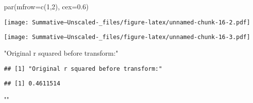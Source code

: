 \documentclass[
]{article}
\newenvironment{Shaded}{\begin{snugshade}}{\end{snugshade}}
\newcommand{\AttributeTok}[1]{\textcolor[rgb]{0.77,0.63,0.00}{#1}}
\newcommand{\DecValTok}[1]{\textcolor[rgb]{0.00,0.00,0.81}{#1}}
\newcommand{\FloatTok}[1]{\textcolor[rgb]{0.00,0.00,0.81}{#1}}
\newcommand{\FunctionTok}[1]{\textcolor[rgb]{0.00,0.00,0.00}{#1}}
\newcommand{\NormalTok}[1]{#1}
\newcommand{\SpecialCharTok}[1]{\textcolor[rgb]{0.00,0.00,0.00}{#1}}
\newcommand{\StringTok}[1]{\textcolor[rgb]{0.31,0.60,0.02}{#1}}
\begin{document}
\begin{Shaded}
\begin{Highlighting}[]
\FunctionTok{par}\NormalTok{(}\AttributeTok{mfrow=}\FunctionTok{c}\NormalTok{(}\DecValTok{1}\NormalTok{,}\DecValTok{2}\NormalTok{), }\AttributeTok{cex=}\FloatTok{0.6}\NormalTok{)}
\end{Highlighting}
\end{Shaded}

\texttt{[image: Summative--Unscaled-\_files/figure-latex/unnamed-chunk-16-2.pdf]}

\begin{Shaded}
\end{Shaded}

\texttt{[image: Summative--Unscaled-\_files/figure-latex/unnamed-chunk-16-3.pdf]}

\begin{Shaded}
\begin{Highlighting}[]
\StringTok{"Original r squared before transform:"}
\end{Highlighting}
\end{Shaded}

\begin{verbatim}
## [1] "Original r squared before transform:"
\end{verbatim}

\begin{Shaded}
\end{Shaded}

\begin{verbatim}
## [1] 0.4611514
\end{verbatim}

\begin{Shaded}
\begin{Highlighting}[]
\StringTok{""}
\end{Highlighting}
\end{Shaded}
\end{document}
